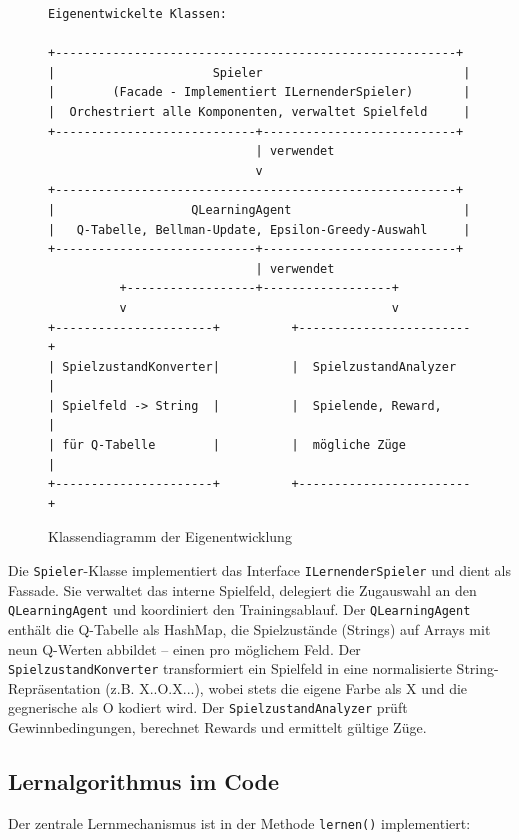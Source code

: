 \begin{figure}[H]
\centering
\begin{verbatim}
Eigenentwickelte Klassen:

+--------------------------------------------------------+
|                      Spieler                            |
|        (Facade - Implementiert ILernenderSpieler)       |
|  Orchestriert alle Komponenten, verwaltet Spielfeld     |
+----------------------------+---------------------------+
                             | verwendet
                             v
+--------------------------------------------------------+
|                   QLearningAgent                        |
|   Q-Tabelle, Bellman-Update, Epsilon-Greedy-Auswahl     |
+----------------------------+---------------------------+
                             | verwendet
          +------------------+------------------+
          v                                     v
+----------------------+          +------------------------+
| SpielzustandKonverter|          |  SpielzustandAnalyzer  |
| Spielfeld -> String  |          |  Spielende, Reward,    |
| für Q-Tabelle        |          |  mögliche Züge         |
+----------------------+          +------------------------+
\end{verbatim}
\caption{Klassendiagramm der Eigenentwicklung}
\end{figure}

Die \texttt{Spieler}-Klasse implementiert das Interface \texttt{ILernenderSpieler} und dient als Fassade. Sie verwaltet das interne Spielfeld, delegiert die Zugauswahl an den \texttt{QLearningAgent} und koordiniert den Trainingsablauf. Der \texttt{QLearningAgent} enthält die Q-Tabelle als HashMap, die Spielzustände (Strings) auf Arrays mit neun Q-Werten abbildet -- einen pro möglichem Feld. Der \texttt{SpielzustandKonverter} transformiert ein Spielfeld in eine normalisierte String-Repräsentation (z.B. \glqq X..O.X...\grqq{}), wobei stets die eigene Farbe als X und die gegnerische als O kodiert wird. Der \texttt{SpielzustandAnalyzer} prüft Gewinnbedingungen, berechnet Rewards und ermittelt gültige Züge.

\subsection{Lernalgorithmus im Code}

Der zentrale Lernmechanismus ist in der Methode \texttt{lernen()} implementiert:

